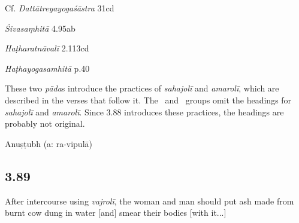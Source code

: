 \begin{ekdosis}
\begin{sources}[hp03_088]
Cf. \emph{Dattātreyayogaśāstra} 31cd
\begin{versinnote}
\end{versinnote}

\emph{Śivasaṃhitā} 4.95ab
\begin{versinnote}
\end{versinnote}
\end{sources}

\begin{testimonia}[hp03_088]
\emph{Haṭharatnāvalī} 2.113cd
\begin{versinnote}
\end{versinnote}

\emph{Haṭhayogasamhitā} p.40
\begin{versinnote}
\end{versinnote}
\end{testimonia}

\begin{philcomm}[hp03_088]
These two \emph{pāda}s introduce the practices of \emph{sahajolī} and \emph{amarolī}, which are described in the verses that follow it. The \textalpha\ and \textbeta\ groups omit the headings for \emph{sahajolī} and \emph{amarolī}. Since 3.88 introduces these practices, the headings are probably not original.

\end{philcomm}

\begin{metre}[hp03_088]
Anuṣṭubh (a: ra-vipulā)
\end{metre}

\subsection*{3.89}
\begin{translation}[hp03_089]
After intercourse using \emph{vajrolī}, the woman and man should put ash made from burnt cow dung in water [and] smear their bodies [with it...]
\end{translation}


\end{ekdosis}
